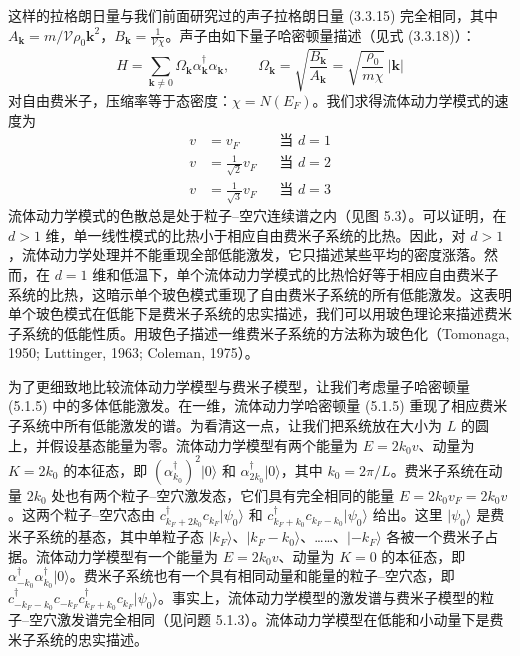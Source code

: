 这样的拉格朗日量与我们前面研究过的声子拉格朗日量 (3.3.15) 完全相同，其中 $A_{\pmb{k}}\allowbreak=m/\mathcal{V}\rho_0\pmb{k}^2$，$B_{\pmb{k}}\allowbreak=\frac{1}{\mathcal{V}\chi}$。声子由如下量子哈密顿量描述（见式 (3.3.18)）：
\begin{equation*}
H=\sum_{\pmb{k}\neq0}\Omega_{\pmb{k}}\alpha_{\pmb{k}}^{\dagger}\alpha_{\pmb{k}},\qquad
\Omega_{\pmb{k}}=\sqrt{\frac{B_{\pmb{k}}}{A_{\pmb{k}}}}=\sqrt{\frac{\rho_0}{m\chi}}\,|\pmb{k}|\tag{5.1.5}
\end{equation*}
对自由费米子，压缩率等于态密度：$\chi=N(E_F)$。我们求得流体动力学模式的速度为
\begin{align*}
v &= v_F && \text{当 } d=1\\
v &= \frac{1}{\sqrt{2}}v_F && \text{当 } d=2\\
v &= \frac{1}{\sqrt{3}}v_F && \text{当 } d=3
\end{align*}
流体动力学模式的色散总是处于粒子--空穴连续谱之内（见图 5.3）。可以证明，在 $d>1$ 维，单一线性模式的比热小于相应自由费米子系统的比热。因此，对 $d>1$，流体动力学处理并不能重现全部低能激发，它只描述某些平均的密度涨落。然而，在 $d=1$ 维和低温下，单个流体动力学模式的比热恰好等于相应自由费米子系统的比热，这暗示单个玻色模式重现了自由费米子系统的所有低能激发。这表明单个玻色模式在低能下是费米子系统的忠实描述，我们可以用玻色理论来描述费米子系统的低能性质。用玻色子描述一维费米子系统的方法称为玻色化（Tomonaga, 1950; Luttinger, 1963; Coleman, 1975）。

为了更细致地比较流体动力学模型与费米子模型，让我们考虑量子哈密顿量 (5.1.5) 中的多体低能激发。在一维，流体动力学哈密顿量 (5.1.5) 重现了相应费米子系统中所有低能激发的谱。为看清这一点，让我们把系统放在大小为 $L$ 的圆上，并假设基态能量为零。流体动力学模型有两个能量为 $E=2k_0v$、动量为 $K=2k_0$ 的本征态，即 $(\alpha_{k_0}^{\dagger})^2|0\rangle$ 和 $\alpha_{2k_0}^{\dagger}|0\rangle$，其中 $k_0=2\pi/L$。费米子系统在动量 $2k_0$ 处也有两个粒子--空穴激发态，它们具有完全相同的能量 $E=2k_0v_F=2k_0v$。这两个粒子--空穴态由 $c_{k_F+2k_0}^{\dagger}c_{k_F}|\psi_0\rangle$ 和 $c_{k_F+k_0}^{\dagger}c_{k_F-k_0}|\psi_0\rangle$ 给出。这里 $|\psi_0\rangle$ 是费米子系统的基态，其中单粒子态 $|k_F\rangle$、$|k_F-k_0\rangle$、……、$|-k_F\rangle$ 各被一个费米子占据。流体动力学模型有一个能量为 $E=2k_0v$、动量为 $K=0$ 的本征态，即 $\alpha_{-k_0}^{\dagger}\alpha_{k_0}^{\dagger}|0\rangle$。费米子系统也有一个具有相同动量和能量的粒子--空穴态，即 $c_{-k_F-k_0}^{\dagger}c_{-k_F}c_{k_F+k_0}^{\dagger}c_{k_F}|\psi_0\rangle$。事实上，流体动力学模型的激发谱与费米子模型的粒子--空穴激发谱完全相同（见问题 5.1.3）。流体动力学模型在低能和小动量下是费米子系统的忠实描述。

